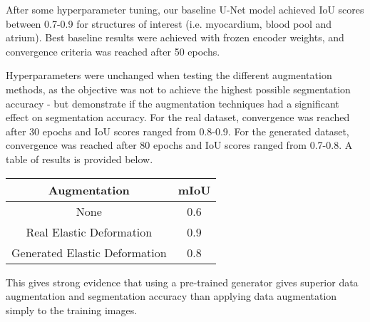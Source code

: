 After some hyperparameter tuning, our baseline U-Net model achieved IoU scores
between 0.7-0.9 for structures of interest (i.e. myocardium, blood
pool and atrium). Best baseline results were achieved with frozen encoder
weights, and convergence criteria was reached after 50 epochs.  \newline

Hyperparameters were unchanged when testing the different augmentation methods,
as the objective was not to achieve the highest possible segmentation accuracy -
but demonstrate if the augmentation techniques had a significant effect on
segmentation accuracy. For the real dataset, convergence was reached after 30
epochs and IoU scores ranged from 0.8-0.9. For the generated dataset,
convergence was reached after 80 epochs and IoU scores ranged from 0.7-0.8. A
table of results is provided below.
\newline

\begin{table}[h]
    \centering
    \begin{tabular}{|c|c|}
    \hline
    \textbf{Augmentation}         & \textbf{mIoU} \\ \hline
    None                          & 0.6           \\ \hline
    Real Elastic Deformation      & 0.9           \\ \hline
    Generated Elastic Deformation & 0.8           \\ \hline
    \end{tabular}
\end{table}

This gives strong evidence that using a pre-trained generator gives superior
data augmentation and segmentation accuracy than applying data augmentation
simply to the training images. \newline